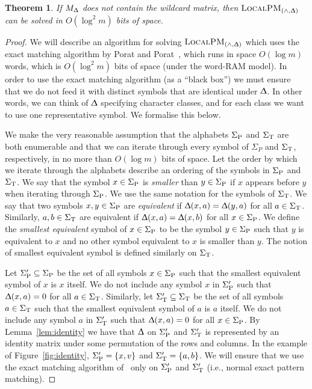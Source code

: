 \documentclass{article}
\renewcommand{\Delta}{\Updelta}
\newcommand{\SigmaP}{\ensuremath{\Sigma_{\textup{P}}}}
\newcommand{\SigmaT}{\ensuremath{\Sigma_{\textup{T}}}}
\newcommand{\local}{\ensuremath{\textsc{LocalPM}}}
\theoremstyle{plain}
\newtheorem{theorem}{Theorem}[]
\theoremstyle{definition}
\begin{document}
\begin{theorem}
    \label{lem:and-exact}
    If $M_{\Delta}$ does not contain the wildcard matrix, then $\local_{(\wedge,\Delta)}$ can be solved in $O(\log^{2}m)$ bits of space.
\end{theorem}
\begin{proof}
    We will describe an algorithm for solving $\local_{(\wedge,\Delta)}$ which uses the exact matching algorithm by Porat and Porat~\cite{Porat:09}, which runs in space $O(\log m)$ words, which is $O(\log^{2}m)$ bits of space (under the word-RAM model). In order to use the exact matching algorithm (as a ``black box'') we must ensure that we do not feed it with distinct symbols that are identical under $\Delta$. In other words, we can think of $\Delta$ specifying character classes, and for each class we want to use one representative symbol. We formalise this below.

    We make the very reasonable assumption that the alphabets $\SigmaP$ and $\SigmaT$ are both enumerable and that we can iterate through every symbol of $\Sigma_{P}$ and $\SigmaT$, respectively, in no more than $O(\log m)$ bits of space. Let the order by which we iterate through the alphabets describe an ordering of the symbols in $\SigmaP$ and $\SigmaT$. We say that the symbol $x\in\SigmaP$ is \emph{smaller} than $y\in\SigmaP$ if $x$ appears before $y$ when iterating through $\SigmaP$. We use the same notation for the symbols of $\SigmaT$. We say that two symbols $x,y\in\SigmaP$ are \emph{equivalent} if $\Delta(x,a)=\Delta(y,a)$ for all $a\in\SigmaT$. Similarly, $a,b\in\SigmaT$ are equivalent if $\Delta(x,a)=\Delta(x,b)$ for all $x\in\SigmaP$. We define the \emph{smallest equivalent} symbol of $x\in\SigmaP$ to be the symbol $y\in\SigmaP$ such that $y$ is equivalent to $x$ and no other symbol equivalent to $x$ is smaller than $y$. The notion of smallest equivalent symbol is defined similarly on $\SigmaT$.

    Let $\SigmaP'\subseteq\SigmaP$ be the set of all symbols $x\in\SigmaP$ such that the smallest equivalent symbol of $x$ is $x$ itself. We do not include any symbol $x$ in $\SigmaP'$ such that $\Delta(x,a)=0$ for all $a\in\SigmaT$. Similarly, let $\SigmaT'\subseteq\SigmaT$ be the set of all symbols $a\in\SigmaT$ such that the smallest equivalent symbol of $a$ is $a$ itself. We do not include any symbol $a$ in $\SigmaT'$ such that $\Delta(x,a)=0$ for all $x\in\SigmaP$. By Lemma~\ref{lem:identity} we have that $\Delta$ on $\SigmaP'$ and $\SigmaT'$ is represented by an identity matrix under some permutation of the rows and columns. In the example of Figure~\ref{fig:identity}, $\SigmaP'=\{x,v\}$ and $\SigmaT'=\{a,b\}$. We will ensure that we use the exact matching algorithm of~\cite{Porat:09} only on $\SigmaP'$ and $\SigmaT'$ (i.e., normal exact pattern matching).


\end{proof}
\end{document}
